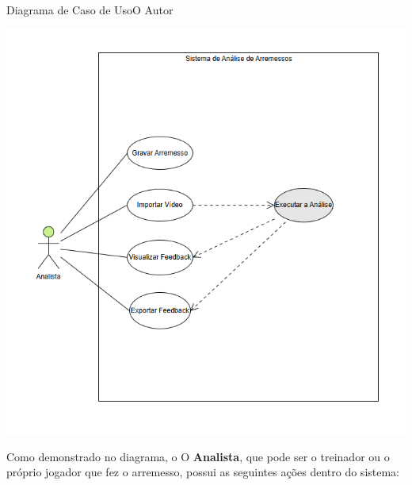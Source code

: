 \begin{figura}{Diagrama de Caso de Uso}{O Autor}
    \begin{flushleft}
        \label{fig:casouso}
        \includegraphics[width=0.70\linewidth]{resources/floats/ilustracoes/casouso.png}
    \end{flushleft}
\end{figura}
\FloatBarrier

Como demonstrado no diagrama, o O \textbf{Analista}, que pode ser o treinador ou o próprio jogador que fez o arremesso, possui as seguintes ações dentro do sistema:

